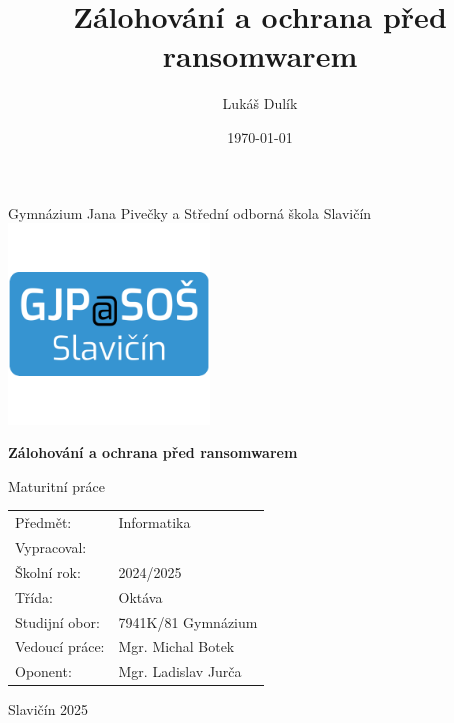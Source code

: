 \documentclass[a4paper,12pt, oneside]{book}
\title{Zálohování a ochrana před ransomwarem}
\author{Lukáš Dulík}
\date{\today} %
\def\topic{Zálohování a ochrana před ransomwarem}
\def\schoolclass{Oktáva}
\begin{document}

\begin{titlepage}
    \begin{center}
        \vspace*{1cm}

        \Large
		Gymnázium Jana Pivečky a Střední odborná škola Slavičín \\

		\includegraphics[width=0.4\textwidth]{img/gjp.png}

		\Huge \textbf{\topic}

        \vspace{0.5cm}
        \Large
        Maturitní práce

    \end{center}
	\vspace{0.7cm}
	\vspace{0.7cm}

	\makeatletter
	\begin{normalsize}
	\null\hfill%
	\begin{tabular}{p{3cm} p{7cm} }
		Předmět: & Informatika \\
		Vypracoval: & \@author \\ 
		Školní rok:	& 2024/2025 \\
		Třída: &	\schoolclass \\
		Studijní obor:	& 7941K/81 Gymnázium	\\
		Vedoucí práce:	& Mgr. Michal Botek \\
		Oponent:	& Mgr. Ladislav Jurča 
	\end{tabular}
\end{normalsize}
	\vspace{0.5cm}
	\vfill

	

	\Large

	\begin{center}
		Slavičín 2025
	\end{center}


	\makeatother

	\vspace{5pt}


\end{titlepage}
\end{document}
